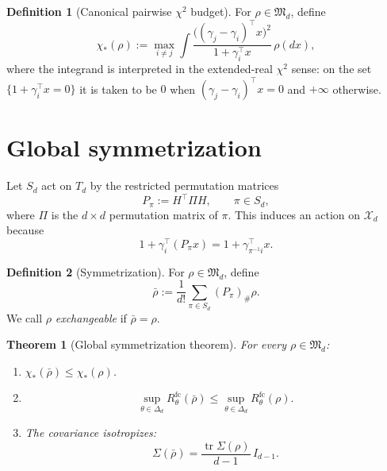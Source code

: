 \documentclass[11pt]{amsart}
\newtheorem{theorem}{Theorem}[section]
\theoremstyle{definition}
\newtheorem{definition}[definition]{Definition}
\DeclareMathOperator{\tr}{tr}
\newcommand{\cX}{\mathcal X}
\newcommand{\fM}{\mathfrak M}
\begin{document}
\begin{definition}[Canonical pairwise $\chi^2$ budget]\label{def:budget}
For $\rho\in\fM_d$, define
\[
\chi_*(\rho):=\max_{i\neq j}\int \frac{\bigl((\gamma_j-\gamma_i)^\top x\bigr)^2}{1+\gamma_i^\top x}\,\rho(dx),
\]
where the integrand is interpreted in the extended-real $\chi^2$ sense: on the set $\{1+\gamma_i^\top x=0\}$ it is taken to be $0$ when $(\gamma_j-\gamma_i)^\top x=0$ and $+\infty$ otherwise.
\end{definition}

\section{Global symmetrization}\label{sec:symmetrization}

Let $S_d$ act on $T_d$ by the restricted permutation matrices
\[
P_\pi:=H^\top \Pi H,\qquad \pi\in S_d,
\]
where $\Pi$ is the $d\times d$ permutation matrix of $\pi$.
This induces an action on $\cX_d$ because
\[
1+\gamma_i^\top(P_\pi x)=1+\gamma_{\pi^{-1}i}^\top x.
\]

\begin{definition}[Symmetrization]
For $\rho\in\fM_d$, define
\[
\bar\rho:=\frac1{d!}\sum_{\pi\in S_d}(P_\pi)_\#\rho.
\]
We call $\rho$ \emph{exchangeable} if $\bar\rho=\rho$.
\end{definition}

\begin{theorem}[Global symmetrization theorem]\label{thm:symmetrization}
For every $\rho\in\fM_d$:
\begin{enumerate}[label=\textup{(\roman*)}]
\item $\chi_*(\bar\rho)\le \chi_*(\rho)$.
\item
\[
\sup_{\theta\in\Delta_d}R^{\mathrm{fc}}_\theta(\bar\rho)
\le
\sup_{\theta\in\Delta_d}R^{\mathrm{fc}}_\theta(\rho).
\]
\item The covariance isotropizes:
\[
\Sigma(\bar\rho)=\frac{\tr\Sigma(\rho)}{d-1}\,I_{d-1}.
\]
\end{enumerate}
\end{theorem}
\end{document}
